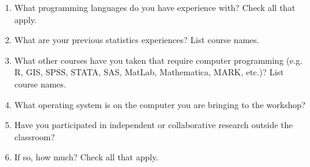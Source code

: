 \documentclass{article}
\begin{document}
\begin{enumerate}
    \item What programming languages do you have experience with? Check all that apply.
        
    \item What are your previous statistics experiences? List course names.   
    
    \item What other courses have you taken that require computer programming (e.g. R, GIS, SPSS, STATA, SAS, MatLab, Mathematica, MARK, etc.)? List course names. 
    
    \item What operating system is on the computer you are bringing to the workshop?
        
    \item Have you participated in independent or collaborative research outside the classroom? 

\newpage        

    \item If so, how much? Check all that apply.
        

\end{enumerate}
\end{document}
